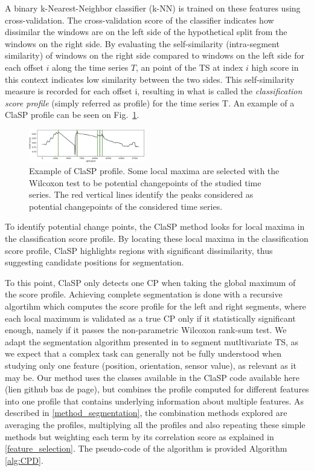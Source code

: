 \documentclass[conference]{IEEEtran}
\begin{document}
A binary k-Nearest-Neighbor classifier (k-NN) is trained on these features using cross-validation. The cross-validation score of the classifier indicates how dissimilar the windows are on the left side of the hypothetical split from the windows on the right side. By evaluating the self-similarity (intra-segment similarity) of windows on the right side compared to windows on the left side for each offset $i$ along the time series $T$, an point of the TS at index $i$ high score in this context indicates low similarity between the two sides. This self-similarity measure is recorded for each offset i, resulting in what is called the \textit{classification score profile} (simply referred as profile) for the time series T. An example of a ClaSP profile can be seen on Fig.~\ref{fig:ClaSProfile}.

\begin{figure}[ht]
  \centering
  \includegraphics[width=0.45\textwidth]{img/ClaspProfile.png}
  \caption{Example of ClaSP profile. Some local maxima are selected with the Wilcoxon test to be potential changepoints of the studied time series. The red vertical lines identify the peaks considered as potential changepoints of the considered time series.}
  \label{fig:ClaSProfile}
\end{figure}

To identify potential change points, the ClaSP method looks for local maxima in the classification score profile. By locating these local maxima in the classification score profile, ClaSP highlights regions with significant dissimilarity, thus suggesting candidate positions for segmentation. 

To this point, ClaSP only detects one CP when taking the global maximum of the score profile. Achieving complete segmentation is done with a recursive algortihm which computes the score profile for the left and right segments, where each local maximum is validated as a true CP only if it statistically significant enough, namely if it passes the non-parametric Wilcoxon rank-sum test. We adapt the segmentation algorithm presented in \cite{clasp} to segment mutltivariate TS, as we expect that a complex task can generally not be fully understood when studying only one feature (position, orientation, sensor value), as relevant as it may be. Our method uses the classes available in the ClaSP code available here (lien github bas de page), but combines the profile computed for different features into one profile that contains underlying information about multiple features. As described in \ref{method_segmentation}, the combination methods explored are averaging the profiles, multiplying all the profiles and also repeating these simple methods but weighting each term by its correlation score as explained in \ref{feature_selection}. The pseudo-code of the algorithm is provided Algorithm \ref{alg:CPD}.
\end{document}
